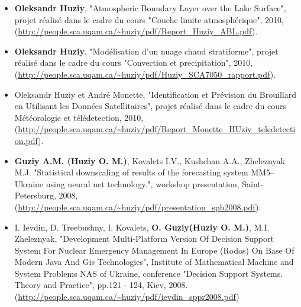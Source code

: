 \documentclass[12pt,a4paper,sans]{moderncv}
\begin{document}
\begin{itemize}
    \item \textbf{Oleksandr Huziy}, "Atmospheric Boundary Layer over the Lake Surface",
           projet réalisé dans le cadre du cours "Couche limite atmosphérique",
           2010, (\url{http://people.sca.uqam.ca/~huziy/pdf/Report_Huziy_ABL.pdf}).
   
    \item \textbf{Oleksandr Huziy}, "Modélisation d’un nuage chaud stratiforme",
       projet réalisé dans le cadre du cours "Convection et precipitation", 2010,
       (\url{http://people.sca.uqam.ca/~huziy/pdf/Huziy_SCA7050_rapport.pdf}).

    \item Oleksandr Huziy et André Monette, "Identification et Prévision du
    Brouillard en Utilisant les Données Satellitaires", projet réalisé dans le cadre du cours Météorologie et télédetection,
       2010, (\url{http://people.sca.uqam.ca/~huziy/pdf/Report_Monette_HUziy_teledetection.pdf}).

    \item \textbf{Guziy A.M. (Huziy O. M.)}, Kovalets I.V., Kushchan A.A.,
    Zheleznyak M.J.
    "Statistical downscaling of results of the forecasting system MM5–Ukraine using neural net technology.",
    workshop presentation, Saint-Petersburg, 2008, (\url{http://people.sca.uqam.ca/~huziy/pdf/presentation_spb2008.pdf}).

    \item I. Ievdin, D. Treebushny, I. Kovalets, \textbf{O. Guziy(Huziy O. M.)}, M.I.
    Zheleznyak, "Development Multi-Platform Version Of Decision Support System For Nuclear Emergency Management In Europe (Rodos)
    On Base Of Modern Java And Gis Technologies", 
    Institute of Mathematical Machine and System Problems NAS of Ukraine, conference
    "Decision Support Systems. Theory and Practice", pp.121 - 124, Kiev, 2008.
     (\url{http://people.sca.uqam.ca/~huziy/pdf/ievdin_sppr2008.pdf})

\end{itemize}
\end{document}
